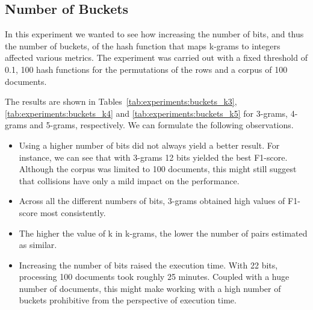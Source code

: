 \documentclass[runningheads]{llncs}
\begin{document}

\subsection{Number of Buckets}
\label{subsec:experiments:buckets}

In this experiment we wanted to see how increasing the number of bits, and thus the number of buckets, of the hash function that maps k-grams to integers affected various metrics. The experiment was carried out with a fixed threshold of 0.1, 100 hash functions for the permutations of the rows and a corpus of 100 documents.  

The results are shown in Tables~\ref{tab:experiments:buckets_k3}, \ref{tab:experiments:buckets_k4} and \ref{tab:experiments:buckets_k5} for 3-grams, 4-grams and 5-grams, respectively. We can formulate the following observations.

\begin{itemize}
  \item Using a higher number of bits did not always yield a better result. For instance, we can see that with 3-grams 12 bits yielded the best F1-score.  Although the corpus was limited to 100 documents, this might still suggest that collisions have only a mild impact on the performance.
  \item Across all the different numbers of bits, 3-grams obtained high values of F1-score most consistently. 
  \item The higher the value of k in k-grams, the lower the number of pairs estimated as similar.
  \item Increasing the number of bits raised the execution time. With 22 bits, processing 100 documents took roughly 25 minutes. Coupled with a huge number of documents, this might make working with a high number of buckets prohibitive from the perspective of execution time.  
\end{itemize}
\end{document}
